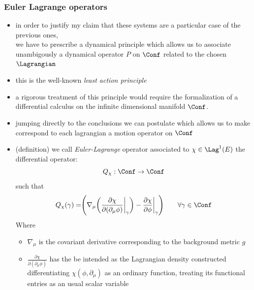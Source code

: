 \documentclass[a4paper,11pt]{scrartcl}
\begin{document}
    \subsubsection*{Euler Lagrange operators}
    \begin{itemize}
        \item in order to justify my claim that these systems are a particular case of the previous ones,\\
         we have to prescribe a dynamical principle which allows us to associate unambigously a dynamical operator $P$ on $\Conf$ related to the chosen $\Lagrangian$
         \item this is the well-known \emph{least action principle}
         \item a rigorous treatment of this principle would require the formalization of a differential calculus on the infinite dimensional  manifold $\Conf$.
         \item jumping directly to the conclusions we can postulate which allows us to make correspond to each lagrangian a motion operator on $\Conf$
         \item (definition) we call \emph{Euler-Lagrange} operator associated to $\chi \in \Lag^1(E)$ the differential operator:
         $$ Q_\chi : \Conf \rightarrow \Conf $$
         such that
         $$     Q_\chi (\gamma) = \Biggr( \nabla_\mu \biggr( \frac{\partial \chi}{\partial(\partial_\mu \phi)} \biggr\vert_\gamma \biggr) - \frac{\partial \chi}{\partial \phi}\biggr\vert_\gamma \Biggr) \qquad \forall \gamma \in \Conf $$
        Where 
        \begin{itemize}
            \item $\nabla_\mu$ is the covariant derivative corresponding to the background metric $g$
            \item $\frac{\partial \chi}{\partial(\partial_\mu \phi)}$ has the be intended as the Lagrangian density constructed differentiating $\chi(\phi, \partial_\mu)$ as an ordinary function, treating its functional entries as an usual scalar variable
        \end{itemize}
    \end{itemize}
\end{document}
